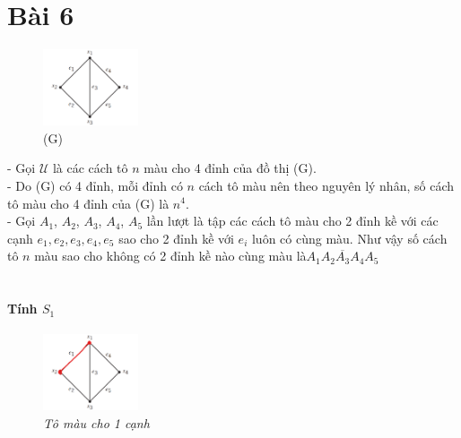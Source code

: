 \documentclass[main.tex]{subfiles}
\begin{document}
\section{Bài 6}

\newcommand{\U}{\ensuremath{\mathcal U} }
\newcommand{\A}[1]{\ensuremath{A_{#1}}}
\newcommand{\x}[1]{\ensuremath{x_{#1}}}
\newcommand{\abs}[1]{\ensuremath{\left|#1\right|}}
\newcommand{\vv}{\dots}

\begin{figure}
\centering
\includegraphics[width=0.25\textwidth]{image/Bai6.png}
\captionsetup{labelformat=empty}
\caption{(G)}
\vspace*{-1cm}
\end{figure}

- Gọi \U là các cách tô $n$ màu cho 4 đỉnh của đồ thị (G).\\
- Do (G) có 4 đỉnh, mỗi đỉnh có $n$ cách tô màu nên theo nguyên lý nhân, số cách tô màu cho 4 đỉnh của (G) là $n^4$.\\
- Gọi \A 1, \A 2, \A 3, \A 4, \A 5 lần lượt là tập các cách tô màu cho 2 đỉnh kề với các cạnh $e_1, e_2, e_3, e_4, e_5$ sao cho 2 đỉnh kề với $e_i$ luôn có cùng màu. Như vậy số cách tô $n$ màu sao cho không có 2 đỉnh kề nào cùng màu là$\overline{\A1\A2\A3\A4\A5}$\\ \\

\paragraph*{Tính $S_1$}
\begin{figure}
\centering
\vspace*{-1cm}
\includegraphics[width=0.25\textwidth]{image/Bai6_S1.png}
\captionsetup{labelformat=empty}
\caption{\textit{Tô màu cho 1 cạnh}}
\vspace*{-1cm}
\end{figure}
\end{document}
